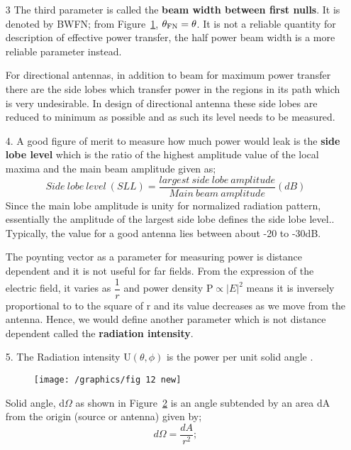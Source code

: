 \begin{enumerate}
Also there is a third parameter which answers to the question of what is the effective angle over which the radiation goes? If we accept the variations of electric fields within the sector but provided radiation does not go to zero, the choice would be the first nulls on either sides of the main beam and then the beam width would be $\theta$ from Figure~\ref{figure11}

\begin{figure}[h]
\centering
\texttt{[image: /graphics/fig 11 new]}
\label{figure11}
\end{figure}
\item[3]The third parameter is called the \textbf{beam width between first nulls}. It is denoted by BWFN; from Figure~\ref{figure11}, $\theta_{\textnormal{FN}}=\theta$. It is not a reliable quantity for description of effective power transfer, the half power beam width is a more reliable parameter instead.

For directional antennas, in addition to beam for maximum power transfer there are the side lobes which transfer power in the regions in its path which is very undesirable. In design of directional antenna these side lobes are reduced to minimum as possible and as such its level needs to be measured.
\item[4.]A good figure of merit to measure how much power would leak is the \textbf{side lobe level} which is the ratio of the highest amplitude value of the local maxima and the main beam amplitude given as;
$$ Side\ lobe\ level\ (SLL)=\frac{largest\ side\ lobe\ amplitude}{Main\ beam\ amplitude}(dB)$$
Since the main lobe amplitude is unity for normalized radiation pattern, essentially the amplitude of the largest side lobe defines the side lobe level.. Typically, the value for a good antenna lies between about -20 to -30dB.

The poynting vector as a parameter for measuring power is distance dependent and it is not useful for far fields. From the expression of the electric field, it varies as $\dfrac{1}{r}$ and power density P$\propto |E|^{2}$ means it is inversely proportional to to the square of  r and its value decreases as we move from the antenna. Hence, we would define another parameter which is not distance dependent called the \textbf{radiation intensity}.
\item[5.] The Radiation intensity U$(\theta, \phi)$ is the power per unit solid angle .

\begin{figure}[h]
\centering
\texttt{[image: /graphics/fig 12 new]}
\label{figure12}
\end{figure}
Solid angle, d$\Omega$ as shown in Figure~\ref{figure12} is an angle subtended by an area dA from the origin (source or antenna) given by;$$d\Omega=\frac{dA}{r^{2}};$$


\end{enumerate}
